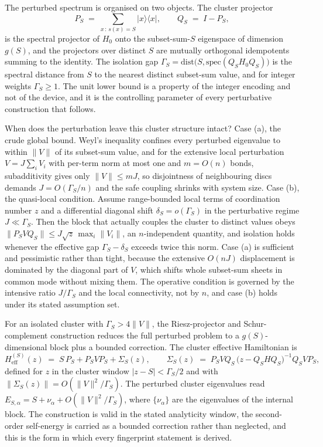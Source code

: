 The perturbed spectrum is organised on two objects. The cluster projector
\begin{equation}\label{def:cluster-projector-Ps}
P_S \;=\; \sum_{x \,:\, s(x) = S} |x\rangle\langle x|, \qquad Q_S \;=\; I - P_S,
\end{equation}
is the spectral projector of $H_0$ onto the subset-sum-$S$ eigenspace of dimension $g(S)$, and the projectors over distinct $S$ are mutually orthogonal idempotents summing to the identity. The isolation gap $\Gamma_S = \mathrm{dist}\bigl(S, \mathrm{spec}(Q_S H_0 Q_S)\bigr)$ is the spectral distance from $S$ to the nearest distinct subset-sum value, and for integer weights $\Gamma_S \ge 1$. The unit lower bound is a property of the integer encoding and not of the device, and it is the controlling parameter of every perturbative construction that follows.

When does the perturbation leave this cluster structure intact? Case (a), the crude global bound. Weyl's inequality \cite{bhatia1997matrix} confines every perturbed eigenvalue to within $\|V\|$ of its subset-sum value, and for the extensive local perturbation $V = J \sum_i V_i$ with per-term norm at most one and $m = O(n)$ bonds, subadditivity gives only $\|V\| \le mJ$, so disjointness of neighbouring discs demands $J = O(\Gamma_S/n)$ and the safe coupling shrinks with system size. Case (b), the quasi-local condition. Assume range-bounded local terms of coordination number $z$ and a differential diagonal shift $\delta_S = o(\Gamma_S)$ in the perturbative regime $J \ll \Gamma_S$. Then the block that actually couples the cluster to distinct values obeys $\|P_S V Q_S\| \le J \sqrt{z}\, \max_i \|V_i\|$, an $n$-independent quantity, and isolation holds whenever the effective gap $\Gamma_S - \delta_S$ exceeds twice this norm. Case (a) is sufficient and pessimistic rather than tight, because the extensive $O(nJ)$ displacement is dominated by the diagonal part of $V$, which shifts whole subset-sum sheets in common mode without mixing them. The operative condition is governed by the intensive ratio $J/\Gamma_S$ and the local connectivity, not by $n$, and case (b) holds under its stated assumption set.

For an isolated cluster with $\Gamma_S > 4\|V\|$, the Riesz-projector and Schur-complement construction \cite{kato1995perturbation} reduces the full perturbed problem to a $g(S)$-dimensional block plus a bounded correction. The cluster effective Hamiltonian is
\begin{equation}\label{def:cluster-effective-hamiltonian}
H_{\mathrm{eff}}^{(S)}(z) \;=\; S\, P_S + P_S V P_S + \Sigma_S(z), \qquad \Sigma_S(z) \;=\; P_S V Q_S\, \bigl(z - Q_S H Q_S\bigr)^{-1} Q_S V P_S,
\end{equation}
defined for $z$ in the cluster window $|z - S| < \Gamma_S/2$ and with $\|\Sigma_S(z)\| = O(\|V\|^2/\Gamma_S)$. The perturbed cluster eigenvalues read $E_{S,\alpha} = S + \nu_\alpha + O(\|V\|^2/\Gamma_S)$, where $\{\nu_\alpha\}$ are the eigenvalues of the internal block. The construction is valid in the stated analyticity window, the second-order self-energy is carried as a bounded correction rather than neglected, and this is the form in which every fingerprint statement is derived.

